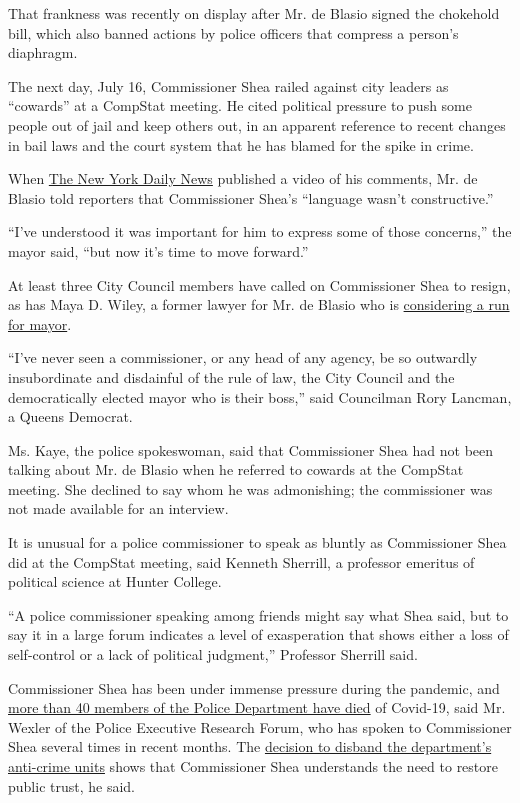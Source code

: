 That frankness was recently on display after Mr. de Blasio signed the
chokehold bill, which also banned actions by police officers that
compress a person's diaphragm.

The next day, July 16, Commissioner Shea railed against city leaders as
``cowards'' at a CompStat meeting. He cited political pressure to push
some people out of jail and keep others out, in an apparent reference to
recent changes in bail laws and the court system that he has blamed for
the spike in crime.

When
\href{https://www.nydailynews.com/new-york/nyc-crime/ny-nypd-commissioner-dermot-shea-calls-city-leaders-cowards-20200718-jqh3qagax5cjda73izzuq3t4xu-story.html}{The
New York Daily News} published a video of his comments, Mr. de Blasio
told reporters that Commissioner Shea's ``language wasn't
constructive.''

``I've understood it was important for him to express some of those
concerns,'' the mayor said, ``but now it's time to move forward.''

At least three City Council members have called on Commissioner Shea to
resign, as has Maya D. Wiley, a former lawyer for Mr. de Blasio who is
\href{https://www.nytimes.com/2020/07/28/nyregion/maya-wiley-mayor-nyc.html}{considering
a run for mayor}.

``I've never seen a commissioner, or any head of any agency, be so
outwardly insubordinate and disdainful of the rule of law, the City
Council and the democratically elected mayor who is their boss,'' said
Councilman Rory Lancman, a Queens Democrat.

Ms. Kaye, the police spokeswoman, said that Commissioner Shea had not
been talking about Mr. de Blasio when he referred to cowards at the
CompStat meeting. She declined to say whom he was admonishing; the
commissioner was not made available for an interview.

It is unusual for a police commissioner to speak as bluntly as
Commissioner Shea did at the CompStat meeting, said Kenneth Sherrill, a
professor emeritus of political science at Hunter College.

``A police commissioner speaking among friends might say what Shea said,
but to say it in a large forum indicates a level of exasperation that
shows either a loss of self-control or a lack of political judgment,''
Professor Sherrill said.

Commissioner Shea has been under immense pressure during the pandemic,
and
\href{https://www1.nyc.gov/site/nypd/about/memorials/covid-19-memorial.page}{more
than 40 members of the Police Department have died} of Covid-19, said
Mr. Wexler of the Police Executive Research Forum, who has spoken to
Commissioner Shea several times in recent months. The
\href{https://www.nytimes.com/2020/06/15/nyregion/nypd-plainclothes-cops.html}{decision
to disband the department's anti-crime units} shows that Commissioner
Shea understands the need to restore public trust, he said.


